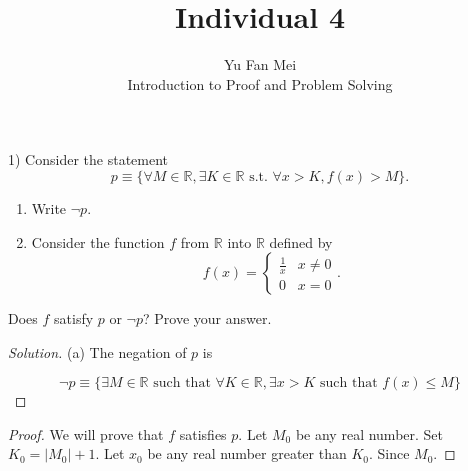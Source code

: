 \documentclass[12pt]{article}
\newenvironment{problem}[2][Problem]{\begin{trivlist}
\item[\hskip \labelsep {\bfseries #1}\hskip \labelsep {\bfseries #2.}]}{\end{trivlist}}
\newenvironment{solution}
               {\let\oldqedsymbol=\qedsymbol
                \renewcommand{\qedsymbol}{$\blacktriangleleft$}
                \begin{proof}[\textit\upshape Solution]}
               {\end{proof}
                \renewcommand{\qedsymbol}{\oldqedsymbol}}
\begin{document}

\title{Individual 4}%
\author{Yu Fan Mei\\ %
	Introduction to Proof and Problem Solving} %

\maketitle

\begin{problem}{12} %
    (1) Consider the statement
    $$p \equiv \{\forall M \in \mathbb{R}, \exists K \in \mathbb{R}\,\, \text{s.t.} \,\,\forall x > K,
    f(x) > M\}.$$
    \begin{enumerate}
    \item[(a)] Write $\neg p$.
    \item[(b)] Consider the function $f$ from $\mathbb{R}$ into $\mathbb{R}$ defined by
    $$f(x) = \begin{cases}
    \frac{1}{x} & x \neq 0\\
    0 & x = 0
    \end{cases}.$$
    \end{enumerate}
    Does $f$ satisfy $p$ or $\neg p$? Prove your answer.
    

\end{problem}

\begin{solution}

    (a) The negation of $p$ is

    $$\lnot p \equiv \{ \exists M \in \mathbb{R} \text{ such that } \forall K \in \mathbb{R}, \exists x > K \text{ such that } f(x) \leq M\}$$
\end{solution}

\begin{proof}
    We will prove that $f$ satisfies $p$. Let $M_0$ be any real number. Set $K_0 = |M_0| + 1$. Let $x_0$ be any real number greater than $K_0$. Since $M_0$.

\end{proof}
\end{document}
